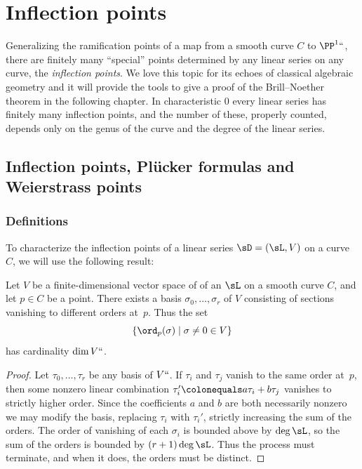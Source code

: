 

\chapter{Inflection points}\label{inflections chapter}
\label{InflectionsChapter}

Generalizing the ramification points of a map from a smooth curve $C$
%
to $\PP^1` `$, there are finitely many ``special'' points determined by
any linear series on any curve, the \emph{inflection points}.
%
We love this topic for its echoes of classical algebraic geometry and
it will provide the tools to give a proof of the Brill--Noether
theorem in the following chapter. In characteristic 0 every linear
series has finitely many inflection points, and the number of these,
properly counted, depends only on the genus of the curve and the
degree of the linear series.

\section{Inflection points,  Pl\"ucker formulas and Weierstrass points}

\subsection*{Definitions}
To characterize the inflection points of a linear series 
$\sD = (\sL, V)$ on a curve $C$, we will use the following result:

\begin{proposition}\label{vanishing sequence} Let $V$ be a
%
  finite-dimensional vector space of 
%
of an 
%
$\sL$ on a smooth curve $C$, and let $p \in C$
be a point. There exists a basis $\sigma_0, \dots, \sigma_r$ of $V$
consisting of sections vanishing to different orders at~$p$. Thus the set 
$$
\{ \ord_p(\sigma) \mid \sigma \neq 0 \in V \}
$$
 has cardinality $\dim V` `$.
\unif
\end{proposition}

\begin{proof} 
Let $\tau_0, \dots, \tau_r$ be any basis of $V` `$.  If  $\tau_i$ and
$\tau_j$ vanish to the same order at~$p$, then
some nonzero linear combination $\tau_i' \colonequals  a\tau_i+b\tau_j$
vanishes to strictly higher order. Since the coefficients $a$ and $b$
are both necessarily nonzero we may modify the basis, replacing $\tau_i$
with $\tau_i'$, strictly increasing the sum of the orders.
The order of vanishing of each $\sigma_i$ is bounded above by $\deg \sL$,
so the sum of the orders is bounded by $(r+1)\deg \sL$. Thus the process
must terminate, and when it does,
 the orders must be distinct.
\end{proof}

